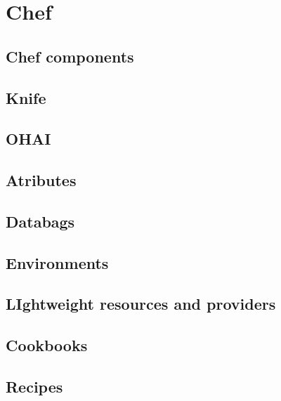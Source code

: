 \chapter{Chef}

\section{Chef components}

\section{Knife}

\section{OHAI}

\section{Atributes}

\section{Databags}

\section{Environments}

\section{LIghtweight resources and providers}

\section{Cookbooks}

\section{Recipes}